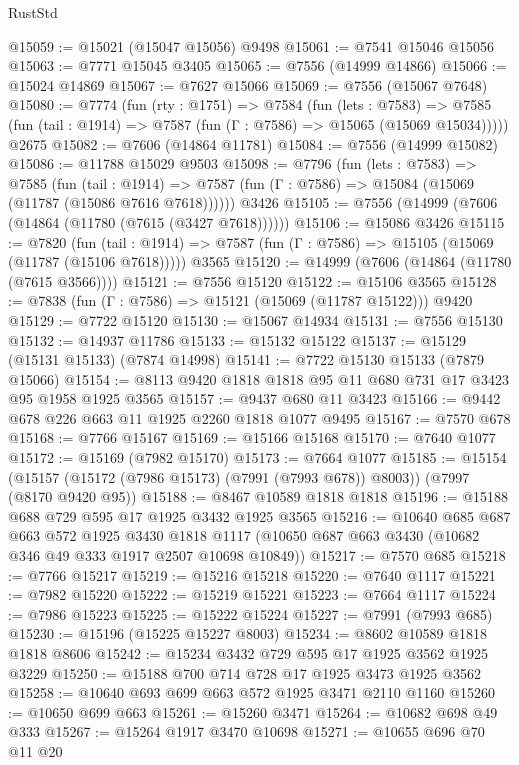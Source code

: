 \begin{lexlean}{RustStd}
\begin{coremodule}
{\begin{coremodule}
{{{{{{{{{{{{{{{{{{{{{{{{{{{{{{{{{{{{{{{{{{{@15059 := @15021 (@15047 @15056) @9498
@15061 := @7541 @15046 @15056
@15063 := @7771 @15045 @3405
@15065 := @7556 (@14999 @14866)
@15066 := @15024 @14869
@15067 := @7627 @15066
@15069 := @7556 (@15067 @7648)
@15080 := @7774
    (fun (rty : @1751) =>
    @7584
      (fun (lets : @7583) =>
      @7585 (fun (tail : @1914) => @7587 (fun (Γ : @7586) => @15065 (@15069 @15034)))))
    @2675
@15082 := @7606 (@14864 @11781)
@15084 := @7556 (@14999 @15082)
@15086 := @11788 @15029 @9503
@15098 := @7796
    (fun (lets : @7583) =>
    @7585
      (fun (tail : @1914) =>
      @7587 (fun (Γ : @7586) => @15084 (@15069 (@11787 (@15086 @7616 @7618))))))
    @3426
@15105 := @7556 (@14999 (@7606 (@14864 (@11780 (@7615 (@3427 @7618))))))
@15106 := @15086 @3426
@15115 := @7820
    (fun (tail : @1914) => @7587 (fun (Γ : @7586) => @15105 (@15069 (@11787 (@15106 @7618)))))
    @3565
@15120 := @14999 (@7606 (@14864 (@11780 (@7615 @3566))))
@15121 := @7556 @15120
@15122 := @15106 @3565
@15128 := @7838 (fun (Γ : @7586) => @15121 (@15069 (@11787 @15122))) @9420
@15129 := @7722 @15120
@15130 := @15067 @14934
@15131 := @7556 @15130
@15132 := @14937 @11786
@15133 := @15132 @15122
@15137 := @15129 (@15131 @15133) (@7874 @14998)
@15141 := @7722 @15130 @15133 (@7879 @15066)
@15154 := @8113 @9420 @1818 @1818 @95 @11 @680 @731 @17 @3423 @95 @1958 @1925 @3565
@15157 := @9437 @680 @11 @3423
@15166 := @9442 @678 @226 @663 @11 @1925 @2260 @1818 @1077 @9495
@15167 := @7570 @678
@15168 := @7766 @15167
@15169 := @15166 @15168
@15170 := @7640 @1077
@15172 := @15169 (@7982 @15170)
@15173 := @7664 @1077
@15185 := @15154
    (@15157 (@15172 (@7986 @15173) (@7991 (@7993 @678)) @8003))
    (@7997 (@8170 @9420 @95))
@15188 := @8467 @10589 @1818 @1818
@15196 := @15188 @688 @729 @595 @17 @1925 @3432 @1925 @3565
@15216 := @10640
    @685
    @687
    @663
    @572
    @1925
    @3430
    @1818
    @1117
    (@10650 @687 @663 @3430 (@10682 @346 @49 @333 @1917 @2507 @10698 @10849))
@15217 := @7570 @685
@15218 := @7766 @15217
@15219 := @15216 @15218
@15220 := @7640 @1117
@15221 := @7982 @15220
@15222 := @15219 @15221
@15223 := @7664 @1117
@15224 := @7986 @15223
@15225 := @15222 @15224
@15227 := @7991 (@7993 @685)
@15230 := @15196 (@15225 @15227 @8003)
@15234 := @8602 @10589 @1818 @1818 @8606
@15242 := @15234 @3432 @729 @595 @17 @1925 @3562 @1925 @3229
@15250 := @15188 @700 @714 @728 @17 @1925 @3473 @1925 @3562
@15258 := @10640 @693 @699 @663 @572 @1925 @3471 @2110 @1160
@15260 := @10650 @699 @663
@15261 := @15260 @3471
@15264 := @10682 @698 @49 @333
@15267 := @15264 @1917 @3470 @10698
@15271 := @10655 @696 @70 @11 @20
}}}}}}}}}}}}}}}}}}}}}}}}}}}}}}}}}}}}}}}}}}}
\end{coremodule}}
\end{coremodule}
\end{lexlean}
